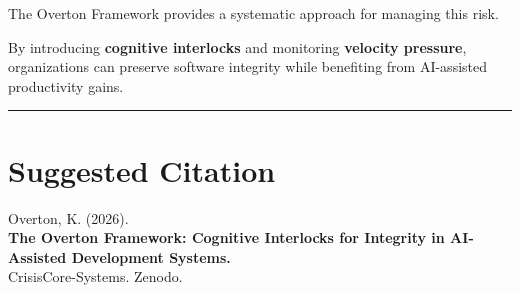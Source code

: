 \documentclass[
]{article}
\begin{document}
The Overton Framework provides a systematic approach for managing this
risk.

By introducing \textbf{cognitive interlocks} and monitoring
\textbf{velocity pressure}, organizations can preserve software
integrity while benefiting from AI-assisted productivity gains.

\begin{center}\rule{0.5\linewidth}{0.5pt}\end{center}

\section{Suggested Citation}\label{suggested-citation}

Overton, K. (2026).\\
\textbf{The Overton Framework: Cognitive Interlocks for Integrity in
AI-Assisted Development Systems.}\\
CrisisCore-Systems. Zenodo.
\end{document}

